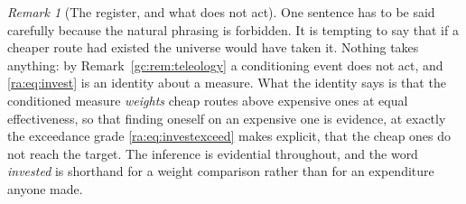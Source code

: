 \documentclass[11pt]{article}
\numberwithin{equation}{section}
\theoremstyle{plain}
\theoremstyle{definition}
\theoremstyle{remark}
\newtheorem{remark}[theorem]{Remark}
\begin{document}
\begin{remark}[The register, and what does not act]\label{ra:rem:investreg}
One sentence has to be said carefully because the natural phrasing is
forbidden. It is tempting to say that if a cheaper route had existed the
universe would have taken it. Nothing takes anything: by
Remark~\ref{gc:rem:teleology} a conditioning event does not act, and
\eqref{ra:eq:invest} is an identity about a measure. What the identity
says is that the conditioned measure \emph{weights} cheap routes above
expensive ones at equal effectiveness, so that finding oneself on an
expensive one is evidence, at exactly the exceedance grade
\eqref{ra:eq:investexceed} makes explicit, that the cheap ones do not
reach the target. The inference is evidential throughout, and the word
\emph{invested} is shorthand for a weight comparison rather than for an
expenditure anyone made.
\end{remark}
\end{document}
